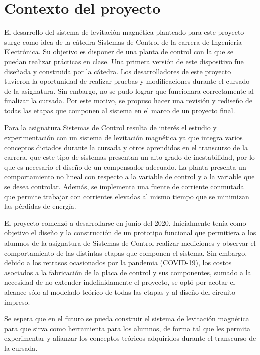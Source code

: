 \section{Contexto del proyecto}

El desarrollo del sistema de levitación magnética planteado para este proyecto surge como idea de la cátedra Sistemas de Control de la carrera de Ingeniería Electrónica. Su objetivo es disponer de una planta de control con la  que se puedan realizar prácticas en clase. Una primera versión de este dispositivo fue diseñada y construida por la cátedra. Los desarrolladores de este proyecto tuvieron la oportunidad de realizar pruebas y modificaciones durante el cursado de la asignatura. Sin embargo, no se pudo lograr que funcionara correctamente al finalizar la cursada. Por este motivo, se propuso hacer una revisión y rediseño de todas las etapas que componen al sistema en el marco de un proyecto final.

Para la asignatura Sistemas de Control resulta de interés el estudio y experimentación con un sistema de levitación magnética ya que integra varios conceptos dictados durante la cursada y otros aprendidos en el transcurso de la carrera. \colorbox{En principio se puede mencionar} que este tipo de sistemas presentan un alto grado de inestabilidad, por lo que es necesario el diseño de un compensador adecuado. La planta presenta un comportamiento no lineal con respecto a la variable de control y a la variable que se desea controlar. Además, se implementa una fuente de corriente conmutada que permite trabajar con corrientes elevadas al mismo tiempo que se minimizan las pérdidas de energía.

El proyecto comenzó a desarrollarse en junio del 2020. Inicialmente tenía como objetivo el diseño y la construcción de un prototipo funcional que permitiera a los alumnos de la asignatura de Sistemas de Control realizar mediciones y observar el comportamiento de las distintas etapas que componen el sistema. Sin embargo, debido a los retrasos ocasionados por la pandemia (COVID-19), los costos asociados a la fabricación de la placa de control y sus componentes, sumado a la  necesidad de no extender indefinidamente el proyecto, se optó por acotar el alcance sólo al modelado teórico de todas las etapas y al diseño del circuito impreso.

Se espera que en el futuro se pueda construir el sistema de levitación magnética para que sirva como herramienta para los alumnos, de forma tal que les permita experimentar y afianzar los conceptos teóricos adquiridos durante el transcurso de la cursada.


